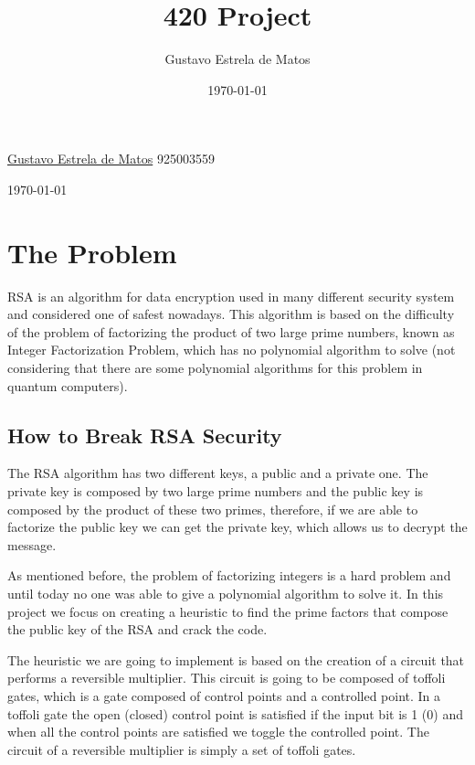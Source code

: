 \documentclass[12pt]{article}
\title{420 Project}
\author{Gustavo Estrela de Matos}
\date{\today}
\begin{document}
\begin{titlepage}
\begin{center}
    \begin{flushleft}
        \textcolor{title_color} {
            \fontsize{2cm}{1em}\selectfont {Trying to break the RSA with Reversible Multiplier Circuits\\}
        }
    \end{flushleft}
  
    \begin{flushleft}{
        \textcolor{text_color} {
        \href{mailto:estrela.gustavo.matos@gmail.com}{Gustavo Estrela de Matos} 925003559\\}
    }
    \end{flushleft}
    \today
\end{center}
\end{titlepage}

\newpage
\section{The Problem}
RSA is an algorithm for data encryption used in many different security system and considered one of safest nowadays. This algorithm is based on the difficulty of the problem of factorizing the product of two large prime numbers, known as Integer Factorization Problem, which has no polynomial algorithm to solve (not considering that there are some polynomial algorithms for this problem in quantum computers).

\subsection{How to Break RSA Security}
The RSA algorithm has two different keys, a public and a private one. The private key is composed by two large prime numbers and the public key is composed by the product of these two primes, therefore, if we are able to factorize the public key we can get the private key,  which allows us to decrypt the message.

As mentioned before, the problem of factorizing integers is a hard problem and until today no one was able to give a polynomial algorithm to solve it. In this project we focus on creating a heuristic to find the prime factors that compose the public key of the RSA and crack the code.

The heuristic we are going to implement is based on the creation of a circuit that performs a reversible multiplier. This circuit is going to be composed of toffoli gates, which is a gate composed of control points and a controlled point. In a toffoli gate the open (closed) control point is satisfied if the input bit is 1 (0) and when all the control points are satisfied we toggle the controlled point. The circuit of a reversible multiplier is simply a set of toffoli gates.
\end{document}
